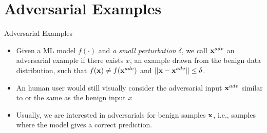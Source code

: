 \documentclass[xcolor=pdftex,dvipsnames,table,mathserif]{beamer}
\begin{document}
\section{Adversarial Examples}
\begin{frame}{Adversarial Examples \cite{Adversarial}}
\begin{itemize}
\item Given a ML model $f(\cdot)$ and \emph{a small perturbation $\delta$}, we call $\mathbf{x}^{adv}$ an adversarial example
if there exists $x$, an example drawn from the benign data distribution, such that $f(\mathbf{x})\neq f(\mathbf{x}^{adv})$ and $||\mathbf{x} - \mathbf{x}^{adv}|| \leq \delta$.
\item An human user would still visually consider the adversarial input $\mathbf{x}^{adv}$ similar to or the same as the benign input $x$
\item Usually, we are interested in adversarials for benign samples $\mathbf{x}$, i.e., samples where the model gives a correct prediction.
\end{itemize}
\end{frame}
\end{document}
